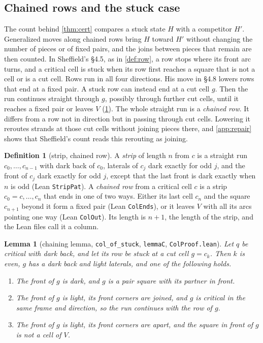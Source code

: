 \documentclass[11pt]{article}
\theoremstyle{plain}
\newtheorem{lemma}[theorem]{Lemma}
\theoremstyle{definition}
\newtheorem{definition}[theorem]{Definition}
\theoremstyle{remark}
\newcommand{\lean}[1]{\texttt{#1}}
\begin{document}
\subsection{Chained rows and the stuck case}
\label{sec:repair}

The count behind \cref{thm:cert} compares a stuck state $H$ with a competitor $H'$.
Generalized moves along chained rows bring $H$ toward $H'$ without changing the number of pieces or
of fixed pairs, and the joins between pieces that remain are then counted.
In Sheffield's \S4.5, as in \cref{def:row}, a row stops where its front arc turns, and a critical
cell is stuck when its row first reaches a square that is not a cell or is a cut cell.
Rows run in all four directions.
His move in \S4.8 lowers rows that end at a fixed pair.
A stuck row can instead end at a cut cell $g$.
Then the run continues straight through $g$, possibly through further cut cells, until it reaches
a fixed pair or leaves $V$ (\cref{lem:chain}).
The whole straight run is a \emph{chained row}.
It differs from a row not in direction but in passing through cut cells.
Lowering it reroutes strands at those cut cells without joining pieces there, and
\cref{app:repair} shows that Sheffield's count reads this rerouting as joining.

\begin{definition}[strip, chained row]
A \emph{strip} of length $n$ from $c$ is a straight run $c_0,\dots,c_{n-1}$ with dark back of $c_0$,
laterals of $c_j$ dark exactly for odd $j$, and the front of $c_j$ dark exactly for odd $j$, except
that the last front is dark exactly when $n$ is odd (Lean \lean{StripPat}).
A \emph{chained row} from a critical cell $c$ is a strip $c_0=c,\dots,c_n$ that ends in one of two
ways.
Either its last cell $c_n$ and the square $c_{n+1}$ beyond it form a fixed pair (Lean
\lean{ColEnds}), or it leaves $V$ with all its arcs pointing one way (Lean \lean{ColOut}).
Its length is $n+1$, the length of the strip, and the Lean files call it a column.
\end{definition}

\begin{lemma}[chaining lemma, \lean{col\_of\_stuck}, \lean{lemmaC}, \lean{ColProof.lean}]
\label{lem:chain}
Let $q$ be critical with dark back, and let its row be stuck at a cut cell $g=c_k$.
Then $k$ is even, $g$ has a dark back and light laterals, and one of the following holds.
\begin{enumerate}
\item The front of $g$ is dark, and $g$ is a pair square with its partner in front.
\item The front of $g$ is light, its front corners are joined, and $g$ is critical in the same
  frame and direction, so the run continues with the row of $g$.
\item The front of $g$ is light, its front corners are apart, and the square in front of $g$ is not
  a cell of $V$.
\end{enumerate}
\end{lemma}
\end{document}
